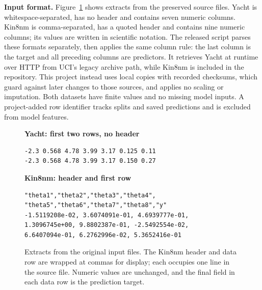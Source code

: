 \textbf{Input format.}
Figure~\ref{fig:original-snippets} shows extracts from the preserved source files.
Yacht is whitespace-separated, has no header and contains seven numeric columns.
Kin8nm is comma-separated, has a quoted header and contains nine numeric columns; its values are written in scientific notation.
The released script parses these formats separately, then applies the same column rule: the last column is the target and all preceding columns are predictors.
It retrieves Yacht at runtime over HTTP from UCI's legacy archive path, while Kin8nm is included in the repository.
This project instead uses local copies with recorded checksums, which guard against later changes to those sources, and applies no scaling or imputation.
Both datasets have finite values and no missing model inputs.
A project-added row identifier tracks splits and saved predictions and is excluded from model features.

\begin{figure}[t]
\centering
\begin{minipage}{\columnwidth}
\footnotesize
\textbf{Yacht: first two rows, no header}
\begin{verbatim}
-2.3 0.568 4.78 3.99 3.17 0.125 0.11
-2.3 0.568 4.78 3.99 3.17 0.150 0.27
\end{verbatim}
\textbf{Kin8nm: header and first row}
\begin{verbatim}
"theta1","theta2","theta3","theta4",
"theta5","theta6","theta7","theta8","y"
-1.5119208e-02, 3.6074091e-01, 4.6939777e-01,
1.3096745e+00, 9.8802387e-01, -2.5492554e-02,
6.6407094e-01, 6.2762996e-02, 5.3652416e-01
\end{verbatim}
\end{minipage}
\caption{Extracts from the original input files.
The Kin8nm header and data row are wrapped at commas for display; each occupies one line in the source file.
Numeric values are unchanged, and the final field in each data row is the prediction target.}
\label{fig:original-snippets}
\end{figure}
